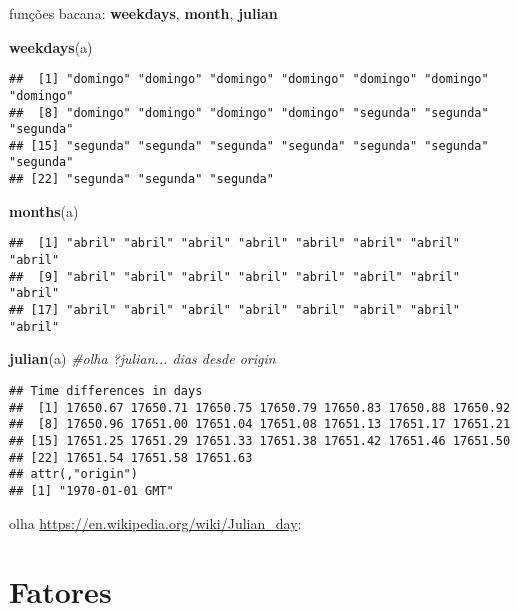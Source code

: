 \documentclass[]{book}
\newenvironment{Shaded}{\begin{snugshade}}{\end{snugshade}}
\newcommand{\KeywordTok}[1]{\textcolor[rgb]{0.13,0.29,0.53}{\textbf{#1}}}
\newcommand{\CommentTok}[1]{\textcolor[rgb]{0.56,0.35,0.01}{\textit{#1}}}
\newcommand{\NormalTok}[1]{#1}
\theoremstyle{definition}
\theoremstyle{definition}
\theoremstyle{definition}
\theoremstyle{remark}
\begin{document}
funções bacana: \textbf{weekdays}, \textbf{month}, \textbf{julian}

\begin{Shaded}
\begin{Highlighting}[]
\KeywordTok{weekdays}\NormalTok{(a)}
\end{Highlighting}
\end{Shaded}

\begin{verbatim}
##  [1] "domingo" "domingo" "domingo" "domingo" "domingo" "domingo" "domingo"
##  [8] "domingo" "domingo" "domingo" "domingo" "segunda" "segunda" "segunda"
## [15] "segunda" "segunda" "segunda" "segunda" "segunda" "segunda" "segunda"
## [22] "segunda" "segunda" "segunda"
\end{verbatim}

\begin{Shaded}
\begin{Highlighting}[]
\KeywordTok{months}\NormalTok{(a)}
\end{Highlighting}
\end{Shaded}

\begin{verbatim}
##  [1] "abril" "abril" "abril" "abril" "abril" "abril" "abril" "abril"
##  [9] "abril" "abril" "abril" "abril" "abril" "abril" "abril" "abril"
## [17] "abril" "abril" "abril" "abril" "abril" "abril" "abril" "abril"
\end{verbatim}

\begin{Shaded}
\begin{Highlighting}[]
\KeywordTok{julian}\NormalTok{(a) }\CommentTok{#olha ?julian... dias desde origin}
\end{Highlighting}
\end{Shaded}

\begin{verbatim}
## Time differences in days
##  [1] 17650.67 17650.71 17650.75 17650.79 17650.83 17650.88 17650.92
##  [8] 17650.96 17651.00 17651.04 17651.08 17651.13 17651.17 17651.21
## [15] 17651.25 17651.29 17651.33 17651.38 17651.42 17651.46 17651.50
## [22] 17651.54 17651.58 17651.63
## attr(,"origin")
## [1] "1970-01-01 GMT"
\end{verbatim}

olha \url{https://en.wikipedia.org/wiki/Julian_day}:

\section{Fatores}\label{fatores}
\end{document}
